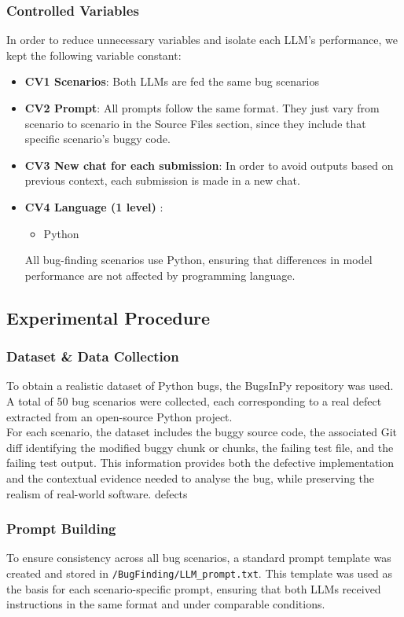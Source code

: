 \documentclass[11pt,a4paper]{article}
\begin{document}
    \subsubsection{Controlled Variables}
    In order to reduce unnecessary variables and isolate each LLM's performance, we kept the following variable constant:
    \begin{itemize}
        \item \textbf{CV1 Scenarios}: Both LLMs are fed the same bug scenarios
        \item \textbf{CV2 Prompt}: All prompts follow the same format. They just vary from scenario to scenario in the Source Files section, since they include that specific scenario's buggy code.
        \item \textbf{CV3 New chat for each submission}: In order to avoid outputs based on previous context, each submission is made in a new chat.
         \item \textbf{CV4 Language (1 level)} :
            \begin{itemize}
                \item Python
            \end{itemize}
            All bug-finding scenarios use Python, ensuring that differences in model performance are not affected by programming language.
    \end{itemize}

    \subsection{Experimental Procedure}
    \subsubsection{Dataset \& Data Collection}
    To obtain a realistic dataset of Python bugs, the BugsInPy\cite{bugsinpy2026} repository was used. A total of 50 bug scenarios were collected, each corresponding to a real defect extracted from an open-source Python project.\\
    For each scenario, the dataset includes the buggy source code, the associated Git diff identifying the modified buggy chunk or chunks, the failing test file, and the failing test output. This information provides both the defective implementation and the contextual evidence needed to analyse the bug, while preserving the realism of real-world software. defects
    \subsubsection{Prompt Building}
    To ensure consistency across all bug scenarios, a standard prompt template was created and stored in \texttt{/BugFinding/LLM\_prompt.txt}. This template was used as the basis for each scenario-specific prompt, ensuring that both LLMs received instructions in the same format and under comparable conditions.
\end{document}
